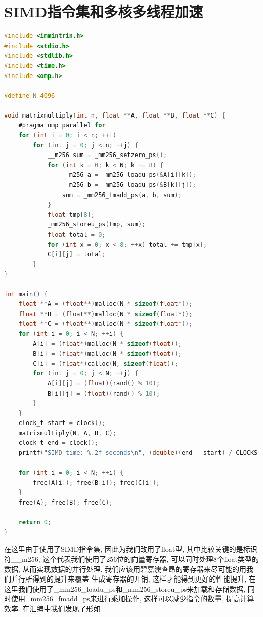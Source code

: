 \documentclass[11pt]{article}
\begin{document}
\section{SIMD指令集和多核多线程加速}
{\setmainfont{Courier New Bold}                                        
    \begin{lstlisting}[language=C]
#include <immintrin.h>
#include <stdio.h>
#include <stdlib.h>
#include <time.h>
#include <omp.h>

#define N 4096

void matrixmultiply(int n, float **A, float **B, float **C) {
    #pragma omp parallel for
    for (int i = 0; i < n; ++i)
        for (int j = 0; j < n; ++j) {
            __m256 sum = _mm256_setzero_ps();
            for (int k = 0; k < N; k += 8) {
                __m256 a = _mm256_loadu_ps(&A[i][k]);
                __m256 b = _mm256_loadu_ps(&B[k][j]);
                sum = _mm256_fmadd_ps(a, b, sum);
            }
            float tmp[8];
            _mm256_storeu_ps(tmp, sum);
            float total = 0;
            for (int x = 0; x < 8; ++x) total += tmp[x];
            C[i][j] = total;
        }
}

int main() {
    float **A = (float**)malloc(N * sizeof(float*));
    float **B = (float**)malloc(N * sizeof(float*));
    float **C = (float**)malloc(N * sizeof(float*));
    for (int i = 0; i < N; ++i) {
        A[i] = (float*)malloc(N * sizeof(float));
        B[i] = (float*)malloc(N * sizeof(float));
        C[i] = (float*)calloc(N, sizeof(float));
        for (int j = 0; j < N; ++j) {
            A[i][j] = (float)(rand() % 10);
            B[i][j] = (float)(rand() % 10);
        }
    }
    clock_t start = clock();
    matrixmultiply(N, A, B, C);
    clock_t end = clock();
    printf("SIMD time: %.2f seconds\n", (double)(end - start) / CLOCKS_PER_SEC);

    for (int i = 0; i < N; ++i) {
        free(A[i]); free(B[i]); free(C[i]);
    }
    free(A); free(B); free(C);

    return 0;
}
\end{lstlisting}}
在这里由于使用了SIMD指令集, 因此为我们改用了float型, 其中比较关键的是标识符\__m256, 这个代表我们使用了256位的向量寄存器, 
可以同时处理8个float类型的数据, 从而实现数据的并行处理. 我们应该用碧嘉澳查昂的寄存器来尽可能的用我们并行所得到的提升来覆盖
生成寄存器的开销, 这样才能得到更好的性能提升, 在这里我们使用了\_mm256\_loadu\_ps和\_mm256\_storeu\_ps来加载和存储数据,
同时使用\_mm256\_fmadd\_ps来进行乘加操作, 这样可以减少指令的数量, 提高计算效率. 在汇编中我们发现了形如
\end{document}
